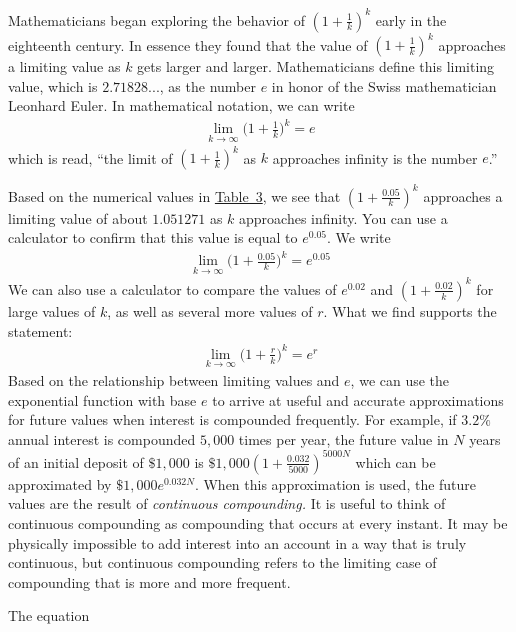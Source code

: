 \documentclass[10pt,]{book}
\theoremstyle{plain}
\theoremstyle{definition}
\theoremstyle{definition}
\theoremstyle{definition}
\numberwithin{equation}{section}
\begin{document}
\hypertarget{p-214}{}%
Mathematicians began exploring the behavior of \((1+\frac{1}{k})^k\) early in the eighteenth century.  In essence they found that the value of \((1+\frac{1}{k})^k\) approaches a limiting value as \(k\) gets larger and larger.  Mathematicians define this limiting value, which is \(2.71828...\), as the number \(e\) in honor of the Swiss mathematician Leonhard Euler.  In mathematical notation, we can write%
%
\begin{gather*}
\lim_{k \to \infty} \bigg(1 + \frac{1}{k}\bigg)^k = e 
\end{gather*}
\hypertarget{p-215}{}%
which is read, “the limit of \((1 + \frac{1}{k})^k\) as \(k\) approaches infinity is the number \(e\).”%
\par
\hypertarget{p-216}{}%
Based on the numerical values in \hyperref[impact-of-k]{Table~3}, we see that \((1 + \frac{0.05}{k})^k\) approaches a limiting value of about \(1.051271\) as \(k\) approaches infinity. You can use a calculator to confirm that this value is equal to \(e^0.05\). We write%
%
\begin{gather*}
\lim_{k \to \infty} \bigg(1 + \frac{0.05}{k}\bigg)^k = e^{0.05}
\end{gather*}
\hypertarget{p-217}{}%
We can also use a calculator to compare the values of \(e^{0.02}\) and \((1 + \frac{0.02}{k})^k\) for large values of \(k\), as well as several more values of \(r\).  What we find supports the statement:%
%
\begin{gather*}
\lim_{k \to \infty} \bigg(1 + \frac{r}{k}\bigg)^k = e^r
\end{gather*}
\hypertarget{p-218}{}%
Based on the relationship between limiting values and \(e\), we can use the exponential function with base \(e\) to arrive at useful and accurate approximations for future values when interest is compounded frequently.  For example, if \(3.2\%\) annual interest is compounded \(5,000\) times per year, the future value in \(N\) years of an initial deposit of \(\$1,000\) is \(\$1,000(1+\frac{0.032}{5000})^{5000N}\) which can be approximated by \(\$1,000e^{0.032N}\).  When this approximation is used, the future values are the result of \emph{continuous compounding.}  It is useful to think of continuous compounding as compounding that occurs at every instant. It may be physically impossible to add interest into an account in a way that is truly continuous, but continuous compounding refers to the limiting case of compounding that is more and more frequent.%
\par
\hypertarget{p-219}{}%
The equation%
\end{document}
